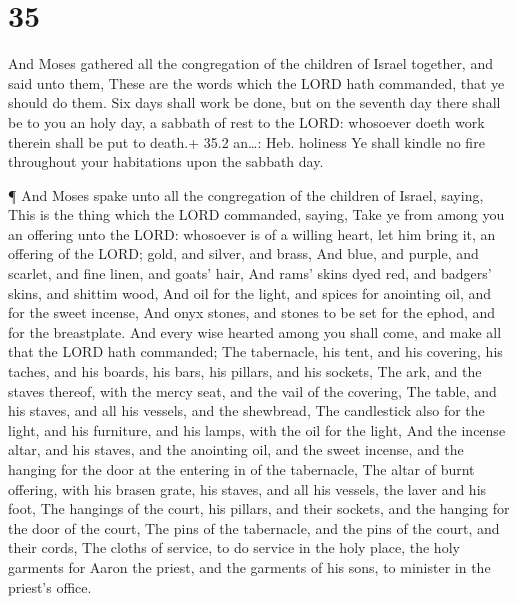 \hypertarget{section-34}{%
\section{35}\label{section-34}}

 And Moses gathered all the congregation of the children of
Israel together, and said unto them, These are the words which the LORD
hath commanded, that ye should do them.  Six days shall work
be done, but on the seventh day there shall be to you an holy day, a
sabbath of rest to the LORD: whosoever doeth work therein shall be put
to death.+ 35.2 an\ldots: Heb. holiness  Ye shall kindle no
fire throughout your habitations upon the sabbath day.

 ¶ And Moses spake unto all the congregation of the children
of Israel, saying, This is the thing which the LORD commanded, saying,
 Take ye from among you an offering unto the LORD: whosoever
is of a willing heart, let him bring it, an offering of the LORD; gold,
and silver, and brass,  And blue, and purple, and scarlet,
and fine linen, and goats' hair,  And rams' skins dyed red,
and badgers' skins, and shittim wood,  And oil for the
light, and spices for anointing oil, and for the sweet incense,
 And onyx stones, and stones to be set for the ephod, and
for the breastplate.  And every wise hearted among you
shall come, and make all that the LORD hath commanded;  The
tabernacle, his tent, and his covering, his taches, and his boards, his
bars, his pillars, and his sockets,  The ark, and the
staves thereof, with the mercy seat, and the vail of the covering,
 The table, and his staves, and all his vessels, and the
shewbread,  The candlestick also for the light, and his
furniture, and his lamps, with the oil for the light,  And
the incense altar, and his staves, and the anointing oil, and the sweet
incense, and the hanging for the door at the entering in of the
tabernacle,  The altar of burnt offering, with his brasen
grate, his staves, and all his vessels, the laver and his foot,
 The hangings of the court, his pillars, and their sockets,
and the hanging for the door of the court,  The pins of the
tabernacle, and the pins of the court, and their cords, 
The cloths of service, to do service in the holy place, the holy
garments for Aaron the priest, and the garments of his sons, to minister
in the priest's office.

